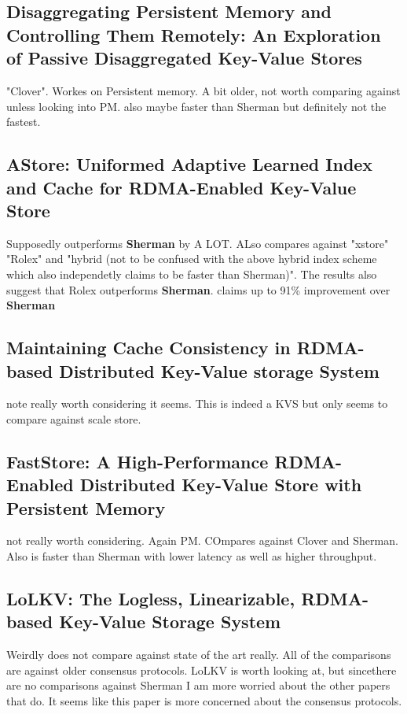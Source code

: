 \documentclass[sigplan,nonacm]{acmart}
\begin{document}
    \subsection{Disaggregating Persistent Memory and Controlling Them Remotely: An Exploration of Passive Disaggregated Key-Value Stores}
    "Clover". Workes on Persistent memory. A bit older, not worth comparing against unless looking into PM. also maybe faster 
    than Sherman but definitely not the fastest.\cite{Tsai-USENIX-2020}

    \subsection{AStore: Uniformed Adaptive Learned Index and Cache for RDMA-Enabled Key-Value Store}
    Supposedly outperforms \textbf{Sherman} by A LOT. ALso compares against "xstore" "Rolex" and "hybrid (not to be confused
    with the above hybrid index scheme which also independetly claims to be faster than Sherman)". 
    The results also suggest that Rolex outperforms \textbf{Sherman}. claims up to 91\% improvement over \textbf{Sherman}\cite{Qiao-IEEEtrans-2024}

    \subsection{Maintaining Cache Consistency in RDMA-based Distributed Key-Value storage System}
    note really worth considering it seems. This is indeed a KVS but only seems to compare against scale store. \cite{Hou-DSIT-2024}

    \subsection{FastStore: A High-Performance RDMA-Enabled Distributed Key-Value Store with Persistent Memory}
    not really worth considering. Again PM. COmpares against Clover and Sherman. Also is faster than Sherman with lower latency 
    as well as higher throughput. \cite{Xiong-ICDCS-2023}

    \subsection{LoLKV: The Logless, Linearizable, RDMA-based Key-Value Storage System}
    Weirdly does not compare against state of the art really. All of the comparisons are against older consensus protocols.
    LoLKV is worth looking at, but sincethere are no comparisons against Sherman I am more worried about the other papers 
    that do. It seems like this paper is more concerned about the consensus protocols. \cite{Alquraan-NSDI-2024}
\end{document}
